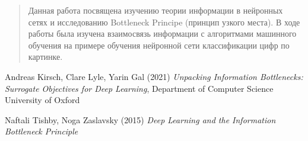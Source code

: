 \pgfplotsset{compat=1.18} 

\maketitle

\newpage
\setcounter{page}{2}

\vspace*{\fill}
\begin{abstract}

Данная работа посвящена изучению  теории информации в нейронных сетях и исследованию Bottleneck Principe (принцип узкого места). В ходе работы была изучена взаимосвязь информации с алгоритмами машинного обучения на примере обучения нейронной сети классификации цифр по картинке.
\end{abstract}
\vspace*{\fill}
\newpage
\tableofcontents
\newpage

\newpage

\newpage

\newpage

\newpage

\newpage

\newpage

\newpage

\begin{thebibliography}{9}
Andreas Kirsch, Clare Lyle, Yarin Gal (2021) \emph{Unpacking Information Bottlenecks: Surrogate Objectives for Deep Learning}, Department of Computer Science University of Oxford

Naftali Tishby, Noga Zaslavsky (2015) \emph{Deep Learning and the Information Bottleneck Principle}
\end{thebibliography}


